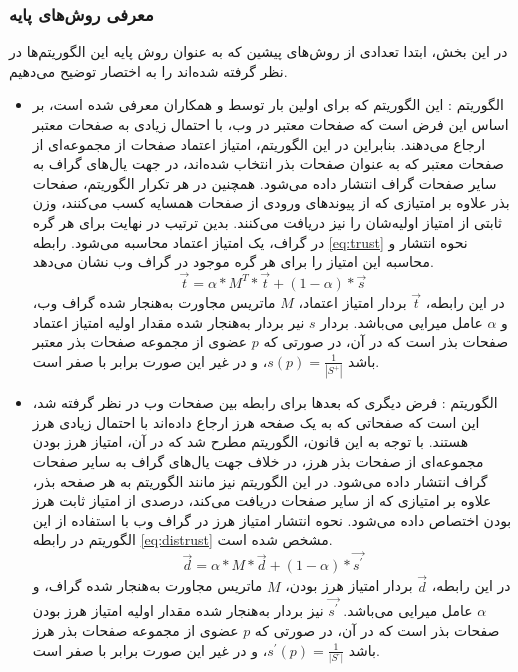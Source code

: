 \documentclass[twoside, a4paper,11pt]{book}
\numberwithin{equation}{chapter}
\numberwithin{table}{chapter}
\numberwithin{figure}{chapter}
\numberwithin{equation}{chapter}
\begin{document}
\subsubsection{معرفی روش‌های پایه}
در این بخش، ابتدا تعدادی از روش‌های پیشین که به عنوان روش پایه این الگوریتم‌ها در نظر گرفته شده‌اند را به اختصار توضیح می‌دهیم.
\begin{itemize}
\item
الگوریتم : این الگوریتم که برای اولین بار توسط  و همکاران \cite{gyongyi2004combating} معرفی شده است، بر اساس این فرض است که صفحات معتبر در وب، با احتمال زیادی به صفحات معتبر ارجاع می‌دهند. بنابراین در این الگوریتم، امتیاز اعتماد صفحات از مجموعه‌ای از صفحات معتبر که به عنوان صفحات بذر انتخاب شده‌اند، در جهت یال‌های گراف به سایر صفحات گراف انتشار داده می‌شود. همچنین در هر تکرار الگوریتم، صفحات بذر علاوه بر امتیازی که از پیوندهای ورودی از صفحات همسایه کسب می‌کنند، وزن ثابتی از امتیاز اولیه‌شان را نیز دریافت می‌کنند. بدین ترتیب در نهایت برای هر گره در گراف، یک امتیاز اعتماد محاسبه می‌شود. رابطه \ref{eq:trust} نحوه انتشار و محاسبه این امتیاز را برای هر گره موجود در گراف وب نشان می‌دهد.
\begin{equation}
\vec{t} = \alpha * M^T*\vec{t} + (1-\alpha)*\vec{s}
	\label{eq:trust}
\end{equation}
در این رابطه، $\vec{t}$ بردار امتیاز اعتماد، $M$ ماتریس مجاورت به‌هنجار شده گراف وب، و $\alpha$ عامل میرایی می‌باشد. بردار $s$ نیر بردار به‌هنجار شده مقدار اولیه امتیاز اعتماد صفحات بذر است که در آن، در صورتی که $p$ عضوی از مجموعه صفحات بذر معتبر باشد $s(p)=\frac{1}{|S^\text{+}|}$، و در غیر این صورت برابر با صفر است.
\item
الگوریتم : فرض دیگری که بعدها برای رابطه بین صفحات وب در نظر گرفته شد، این است که صفحاتی که به یک صفحه هرز ارجاع داده‌اند با احتمال زیادی هرز هستند. با توجه به این قانون، الگوریتم  \cite{krishnan2006web} مطرح شد که در آن، امتیاز هرز بودن مجموعه‌ای از صفحات بذر هرز، در خلاف جهت یال‌های گراف به سایر صفحات گراف انتشار داده می‌شود. در این الگوریتم نیز مانند الگوریتم  به هر صفحه بذر، علاوه بر امتیازی که از سایر صفحات دریافت می‌کند، درصدی از امتیاز ثابت هرز بودن اختصاص داده می‌شود. نحوه انتشار امتیاز هرز در گراف وب با استفاده از این الگوریتم در رابطه \ref{eq:distrust} مشخص شده است.
\begin{equation}
\vec{d} = \alpha * M*\vec{d}+(1-\alpha)*\vec{s^\prime}
	\label{eq:distrust}
\end{equation}
در این رابطه، $\vec{d}$ بردار امتیاز هرز بودن، $M$ ماتریس مجاورت به‌هنجار شده گراف، و $\alpha$ عامل میرایی می‌باشد.  $\vec{s^\prime}$ نیز بردار به‌هنجار شده مقدار اولیه امتیاز هرز بودن صفحات بذر است که در آن، در صورتی که $p$ عضوی از مجموعه صفحات بذر هرز باشد $s^\prime(p)=\frac{1}{|S^\text{-}|}$، و در غیر این صورت برابر با صفر است.

\end{itemize}
\end{document}
